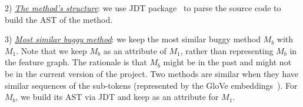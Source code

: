2) {\em \underline{The method's structure}}: we use JDT
package~\cite{JDT} to parse the source code to build the AST of the
method.

3) {\em \underline{Most similar buggy method}}: we keep the most
  similar buggy method $M_b$ with $M_1$. Note that we keep $M_b$ as an
  attribute of $M_1$, rather than representing $M_b$ in the feature
  graph. The rationale is that $M_b$ might be in the past and might
  not be in the current version of the project. Two methods are
  similar when they have similar sequences of the sub-tokens
  (represented by the GloVe embeddings~\cite{glove2014}).  For $M_b$,
  we build its AST via JDT and keep as an attribute for $M_1$.




